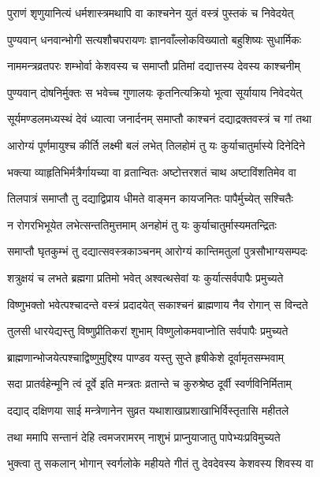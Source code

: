 \twolineshloka
{पुराणं शृणुयानित्यं धर्मशास्त्रमथापि वा}
{काश्चनेन युतं वस्त्रं पुस्तकं च निवेदयेत्} %

\twolineshloka
{पुण्यवान् धनवान्भोगी सत्यशौचपरायणः}
{ज्ञानवाँल्लोकविख्यातो बहुशिष्यः सुधार्मिकः} %

\twolineshloka
{नाममन्त्रव्रतपरः शम्भोर्वा केशवस्य च}
{समाप्तौ प्रतिमां दद्यात्तस्य देवस्य काश्चनीम्} %

\twolineshloka
{पुण्यवान् दोषनिर्मुक्तः स भवेच्च गुणालयः}
{कृतनित्यक्रियो भूत्वा सूर्यायाय निवेदयेत्} %

\twolineshloka
{सूर्यमण्डलमध्यस्थं देवं ध्यात्वा जनार्दनम्}
{समाप्तौ काश्चनं दद्याद्रक्तवस्त्रं च गां तथा} %

\twolineshloka
{आरोग्यं पूर्णमायुश्च कीर्ति लक्ष्मी बलं लभेत्}
{तिलहोमं तु यः कुर्याचातुर्मास्ये दिनेदिने} %

\twolineshloka
{भक्त्या व्याहृतिभिर्मत्रैर्गायच्या वा व्रतान्वितः}
{अष्टोत्तरशतं चाथ अष्टाविंशतिमेव वा} %

\twolineshloka
{तिलपात्रं समाप्तौ तु दद्याद्विप्राय धीमते}
{वाङ्मन कायजनितः पापैर्मुच्येत् सश्चितैः} %

\twolineshloka
{न रोगरभिभूयेत लभेत्सन्ततिमुत्तमाम्}
{अनहोमं तु यः कुर्याचातुर्मास्यमतन्द्रितः} %

\twolineshloka
{समाप्तौ घृतकुम्भं तु दद्यात्सवस्त्रकाञ्चनम्}
{आरोग्यं कान्तिमतुलां पुत्रसौभाग्यसम्पदः} %

\twolineshloka
{शत्रुक्षयं च लभते ब्रह्मगा प्रतिमो भवेत्}
{अश्वत्थसेवां यः कुर्यात्सर्वपापैः प्रमुच्यते} %

\twolineshloka
{विष्णुभक्तो भवेत्पश्चादन्ते वस्त्रं प्रदादयेत्}
{सकाश्चनं ब्राह्मणाय नैव रोगान् स विन्दते} %

\twolineshloka
{तुलसी धारयेद्यस्तु विष्णुप्रीतिकरां शुभाम्}
{विष्णुलोकमवाप्नोति सर्वपापैः प्रमुच्यते} %

\twolineshloka
{ब्राह्मणान्भोजयेत्पश्चाद्विष्णुमुद्दिश्य पाण्डव}
{यस्तु सुप्ते हृषीकेशे दूर्वामृतसम्भवाम्} %

\twolineshloka
{सदा प्रातर्वहेन्मूनि त्वं दूर्वे इति मन्त्रतः}
{व्रतान्ते च कुरुश्रेष्ठ दूर्वी स्वर्णविनिर्मिताम्} %

\twolineshloka
{दद्याद् दक्षिणया साई मन्त्रेणानेन सुव्रत}
{यथाशाखाप्रशाखाभिर्विस्तृतासि महीतले} %

\twolineshloka
{तथा ममापि सन्तानं देहि त्वमजरामरम्}
{नाशुभं प्राप्नुयाजातु पापेभ्यःप्रविमुच्यते} %

\twolineshloka
{भुक्त्वा तु सकलान् भोगान् स्वर्गलोके महीयते}
{गीतं तु देवदेवस्य केशवस्य शिवस्य वा} %

